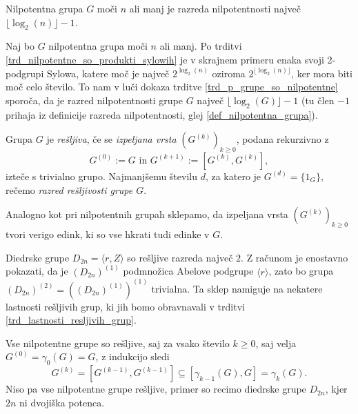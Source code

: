 \begin{posledica}\label{psl_ocena_razreda_nilpotentnosti}
    Nilpotentna grupa $G$ moči $n$ ali manj je razreda nilpotentnosti največ $\lfloor \log_2(n) \rfloor - 1$.
\end{posledica}
\begin{dokaz}
    Naj bo $G$ nilpotentna grupa moči $n$ ali manj. Po trditvi \ref{trd_nilpotentne_so_produkti_sylowih} je v skrajnem primeru enaka svoji 2-podgrupi Sylowa, katere moč je največ $2^{\log_2(n)}$ oziroma $2^{\lfloor \log_2(n) \rfloor}$, ker  mora biti moč celo število.
    To nam v luči dokaza trditve \ref{trd_p_grupe_so_nilpotentne} sporoča, da je razred nilpotentnosti grupe $G$ največ $\lfloor \log_2(G) \rfloor - 1$ (tu člen $-1$ prihaja iz definicije razreda nilpotentnosti, glej \ref{def_nilpotentna_grupa}).  
\end{dokaz}
\begin{definicija}

    \label{def_resljiva_grupa}
    Grupa $G$ je \emph{rešljiva}, če se \emph{izpeljana vrsta} $(G^{(k)})_{k \ge 0}$, podana rekurzivno z \begin{equation*}
        G^{(0)} := G \text{ in } G^{(k + 1)} := [G^{(k)}, G^{(k)}],
        \end{equation*}  
        izteče s trivialno grupo. Najmanjšemu številu $d$, za katero je $G^{(d)} = \{ 1_G \}$, rečemo \emph{razred rešljivosti grupe $G$}.    
    \end{definicija}

    Analogno kot pri nilpotentnih grupah sklepamo, da izpeljana vrsta $(G^{(k)})_{k \ge 0}$ tvori verigo edink, ki so vse hkrati tudi edinke v $G$.
    
    \begin{primer}
        Diedrske grupe $D_{2n} = \langle r , Z \rangle$ so rešljive razreda največ $2$. Z računom je enostavno pokazati, da je $(D_{2n})^{(1)}$ podmnožica Abelove podgrupe $\langle r \rangle$, zato bo grupa $(D_{2n})^{(2)} = ((D_{2n})^{(1)})^{(1)}$ trivialna.
        Ta sklep namiguje na nekatere lastnosti rešljivih grup, ki jih bomo obravnavali v trditvi \ref{trd_lastnosti_resljivih_grup}. 
    \end{primer}

    \begin{primer}
        Vse nilpotentne grupe so rešljive, saj za vsako število $k \ge 0$, saj velja $G^{(0)} = \gamma_0(G) = G$, z indukcijo sledi \begin{equation*}
        G^{(k)} = [G^{(k-1)}, G^{(k-1)}] \subseteq  [\gamma_{k -1}(G), G] = \gamma_{k}(G).
        \end{equation*}
        Niso pa vse nilpotentne grupe rešljive, primer so recimo diedrske grupe $D_{2n}$, kjer $2n$ ni dvojiška potenca. 
    \end{primer}
    
